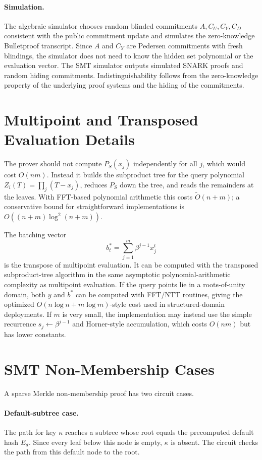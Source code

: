\documentclass[runningheads]{llncs}
\newcommand{\softO}{\widetilde{O}}
\begin{document}
\paragraph{Simulation.}
The algebraic simulator chooses random blinded commitments \(A,C_U,C_Y,C_D\) consistent with the public commitment update and simulates the zero-knowledge Bulletproof transcript.  Since \(A\) and \(C_Y\) are Pedersen commitments with fresh blindings, the simulator does not need to know the hidden set polynomial or the evaluation vector.  The SMT simulator outputs simulated SNARK proofs and random hiding commitments.  Indistinguishability follows from the zero-knowledge property of the underlying proof systems and the hiding of the commitments.

\section{Multipoint and Transposed Evaluation Details}\label{app:mpe}

The prover should not compute \(P_S(x_j)\) independently for all \(j\), which would cost \(O(nm)\).  Instead it builds the subproduct tree for the query polynomial \(Z_i(T)=\prod_j(T-x_j)\), reduces \(P_S\) down the tree, and reads the remainders at the leaves.  With FFT-based polynomial arithmetic this costs \(\softO(n+m)\); a conservative bound for straightforward implementations is \(O((n+m)\log^2(n+m))\).

The batching vector
\[
        b_t^*=\sum_{j=1}^m\beta^{j-1}x_j^t
\]
is the transpose of multipoint evaluation.  It can be computed with the transposed subproduct-tree algorithm in the same asymptotic polynomial-arithmetic complexity as multipoint evaluation.  If the query points lie in a roots-of-unity domain, both \(y\) and \(b^*\) can be computed with FFT/NTT routines, giving the optimized \(O(n\log n+m\log m)\)-style cost used in structured-domain deployments.  If \(m\) is very small, the implementation may instead use the simple recurrence \(s_j\leftarrow \beta^{j-1}\) and Horner-style accumulation, which costs \(O(nm)\) but has lower constants.

\section{SMT Non-Membership Cases}\label{app:smt-nonmem}

A sparse Merkle non-membership proof has two circuit cases.

\paragraph{Default-subtree case.}
The path for key \(\kappa\) reaches a subtree whose root equals the precomputed default hash \(E_d\).  Since every leaf below this node is empty, \(\kappa\) is absent.  The circuit checks the path from this default node to the root.
\end{document}
